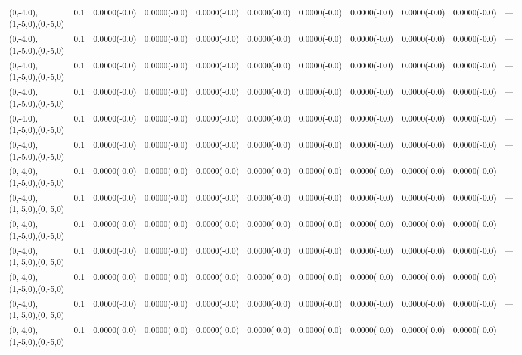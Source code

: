 \begin{tabular}{lrlllllllll}
 (0,-4,0),(1,-5,0),(0,-5,0) &    0.1 & 0.0000(-0.0) & 0.0000(-0.0) & 0.0000(-0.0) & 0.0000(-0.0)   & 0.0000(-0.0) & 0.0000(-0.0)   & 0.0000(-0.0) & 0.0000(-0.0) & ---    \\
 (0,-4,0),(1,-5,0),(0,-5,0) &    0.1 & 0.0000(-0.0) & 0.0000(-0.0) & 0.0000(-0.0) & 0.0000(-0.0)   & 0.0000(-0.0) & 0.0000(-0.0)   & 0.0000(-0.0) & 0.0000(-0.0) & ---    \\
 (0,-4,0),(1,-5,0),(0,-5,0) &    0.1 & 0.0000(-0.0) & 0.0000(-0.0) & 0.0000(-0.0) & 0.0000(-0.0)   & 0.0000(-0.0) & 0.0000(-0.0)   & 0.0000(-0.0) & 0.0000(-0.0) & ---    \\
 (0,-4,0),(1,-5,0),(0,-5,0) &    0.1 & 0.0000(-0.0) & 0.0000(-0.0) & 0.0000(-0.0) & 0.0000(-0.0)   & 0.0000(-0.0) & 0.0000(-0.0)   & 0.0000(-0.0) & 0.0000(-0.0) & ---    \\
 (0,-4,0),(1,-5,0),(0,-5,0) &    0.1 & 0.0000(-0.0) & 0.0000(-0.0) & 0.0000(-0.0) & 0.0000(-0.0)   & 0.0000(-0.0) & 0.0000(-0.0)   & 0.0000(-0.0) & 0.0000(-0.0) & ---    \\
 (0,-4,0),(1,-5,0),(0,-5,0) &    0.1 & 0.0000(-0.0) & 0.0000(-0.0) & 0.0000(-0.0) & 0.0000(-0.0)   & 0.0000(-0.0) & 0.0000(-0.0)   & 0.0000(-0.0) & 0.0000(-0.0) & ---    \\
 (0,-4,0),(1,-5,0),(0,-5,0) &    0.1 & 0.0000(-0.0) & 0.0000(-0.0) & 0.0000(-0.0) & 0.0000(-0.0)   & 0.0000(-0.0) & 0.0000(-0.0)   & 0.0000(-0.0) & 0.0000(-0.0) & ---    \\
 (0,-4,0),(1,-5,0),(0,-5,0) &    0.1 & 0.0000(-0.0) & 0.0000(-0.0) & 0.0000(-0.0) & 0.0000(-0.0)   & 0.0000(-0.0) & 0.0000(-0.0)   & 0.0000(-0.0) & 0.0000(-0.0) & ---    \\
 (0,-4,0),(1,-5,0),(0,-5,0) &    0.1 & 0.0000(-0.0) & 0.0000(-0.0) & 0.0000(-0.0) & 0.0000(-0.0)   & 0.0000(-0.0) & 0.0000(-0.0)   & 0.0000(-0.0) & 0.0000(-0.0) & ---    \\
 (0,-4,0),(1,-5,0),(0,-5,0) &    0.1 & 0.0000(-0.0) & 0.0000(-0.0) & 0.0000(-0.0) & 0.0000(-0.0)   & 0.0000(-0.0) & 0.0000(-0.0)   & 0.0000(-0.0) & 0.0000(-0.0) & ---    \\
 (0,-4,0),(1,-5,0),(0,-5,0) &    0.1 & 0.0000(-0.0) & 0.0000(-0.0) & 0.0000(-0.0) & 0.0000(-0.0)   & 0.0000(-0.0) & 0.0000(-0.0)   & 0.0000(-0.0) & 0.0000(-0.0) & ---    \\
 (0,-4,0),(1,-5,0),(0,-5,0) &    0.1 & 0.0000(-0.0) & 0.0000(-0.0) & 0.0000(-0.0) & 0.0000(-0.0)   & 0.0000(-0.0) & 0.0000(-0.0)   & 0.0000(-0.0) & 0.0000(-0.0) & ---    \\
 (0,-4,0),(1,-5,0),(0,-5,0) &    0.1 & 0.0000(-0.0) & 0.0000(-0.0) & 0.0000(-0.0) & 0.0000(-0.0)   & 0.0000(-0.0) & 0.0000(-0.0)   & 0.0000(-0.0) & 0.0000(-0.0) & ---    \\
\hline
\end{tabular}